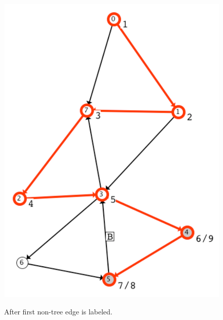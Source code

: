 \begin{figure}
\begin{minipage}{0.49\textwidth}
\includegraphics[scale=0.5]{X_dfs_d_1}

After first non-tree edge is labeled. 

\medskip


\end{minipage}
\end{figure}
